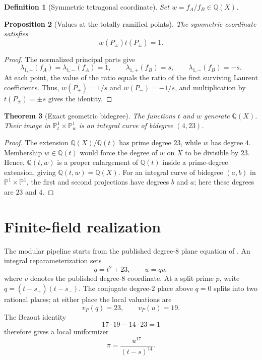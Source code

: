 \documentclass[11pt]{article}
\newtheorem{theorem}{Theorem}[section]
\newtheorem{proposition}[theorem]{Proposition}
\newtheorem{definition}[theorem]{Definition}
\newcommand{\Q}{\mathbb Q}
\newcommand{\PP}{\mathbb P}
\begin{document}
\begin{definition}[Symmetric tetragonal coordinate]
Set $w=f_A/f_B\in\Q(X)$.
\end{definition}

\begin{proposition}[Values at the totally ramified points]\label{prop:wt-law}
The symmetric coordinate satisfies
\[
\boxed{w(P_\pm)t(P_\pm)=1}.
\]
\end{proposition}

\begin{proof}
The normalized principal parts give
\[
\lambda_{1,+}(f_A)=\lambda_{1,-}(f_A)=1,
\qquad
\lambda_{1,+}(f_B)=s,
\qquad
\lambda_{1,-}(f_B)=-s.
\]
At each point, the value of the ratio equals the ratio of the first surviving Laurent coefficients.  Thus, $w(P_+)=1/s$ and $w(P_-)=-1/s$, and multiplication by $t(P_\pm)=\pm s$ gives the identity.
\end{proof}

\begin{theorem}[Exact geometric bidegree]\label{thm:bidegree}
The functions $t$ and $w$ generate $\Q(X)$.  Their image in $\PP^1_t\times\PP^1_w$ is an integral curve of bidegree $(4,23)$.
\end{theorem}

\begin{proof}
The extension $\Q(X)/\Q(t)$ has prime degree $23$, while $w$ has degree $4$.  Membership $w\in\Q(t)$ would force the degree of $w$ on $X$ to be divisible by $23$.  Hence, $\Q(t,w)$ is a proper enlargement of $\Q(t)$ inside a prime-degree extension, giving $\Q(t,w)=\Q(X)$.  For an integral curve of bidegree $(a,b)$ in $\PP^1\times\PP^1$, the first and second projections have degrees $b$ and $a$; here these degrees are $23$ and $4$.
\end{proof}
\section{Finite-field realization}\label{sec:modular}

The modular pipeline starts from the published degree-$8$ plane equation of \cite{HJLPPZ2026}.  An integral reparameterization sets
\[
 q=t^2+23,
 \qquad
 u=qv,
\]
where $v$ denotes the published degree-$8$ coordinate.  At a split prime $p$, write $q=(t-s_+)(t-s_-)$.  The conjugate degree-$2$ place above $q=0$ splits into two rational places; at either place the local valuations are
\[
 v_P(q)=23,
 \qquad
 v_P(u)=19.
\]
The Bezout identity
\[
 17\cdot19-14\cdot23=1
\]
therefore gives a local uniformizer
\[
 \pi=\frac{u^{17}}{(t-s)^{14}}.
\]
\end{document}

